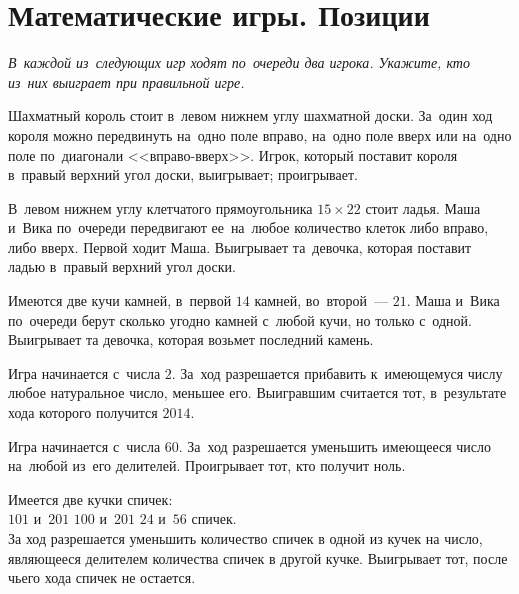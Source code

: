 
\section*{Математические игры. Позиции}


\emph{%
В~каждой из~следующих игр ходят по~очереди два игрока.
Укажите, кто из~них выиграет при правильной игре.}

\begin{problems}

\item
Шахматный король стоит в~левом нижнем углу шахматной доски.
За~один ход короля можно передвинуть на~одно поле вправо, на~одно поле вверх
или на~одно поле по~диагонали <<вправо-вверх>>.
Игрок, который поставит короля в~правый верхний угол доски,
\quad
\subproblemx{$^\circ$} выигрывает;
\quad
\subproblem проигрывает.

\item
В~левом нижнем углу клетчатого прямоугольника $15 \times 22$ стоит ладья.
Маша и~Вика по~очереди передвигают ее~на~любое количество клеток либо вправо,
либо вверх.
Первой ходит Маша.
Выигрывает та~девочка, которая поставит ладью в~правый верхний угол доски.

\item
Имеются две кучи камней, в~первой $14$ камней, во~второй~--- $21$.
Маша и~Вика по~очереди берут сколько угодно камней с~любой кучи, но только
с~одной.
Выигрывает та девочка, которая возьмет последний камень.

\item
Игра начинается с~числа $2$.
За~ход разрешается прибавить к~имеющемуся числу любое натуральное число,
меньшее его.
Выигравшим считается тот, в~результате хода которого получится $2014$.

\item
Игра начинается с~числа $60$.
За~ход разрешается уменьшить имеющееся число на~любой из~его делителей.
Проигрывает тот, кто получит ноль.

\item
Имеется две кучки спичек:
\\
\subproblem $101$ и~$201$
\quad
\subproblem $100$ и~$201$
\quad
\subproblemx{*} $24$ и~$56$
\quad
спичек.
\\
За ход разрешается уменьшить количество спичек в одной из кучек на число,
являющееся делителем количества спичек в другой кучке.
Выигрывает тот, после чьего хода спичек не остается.


\end{problems}

